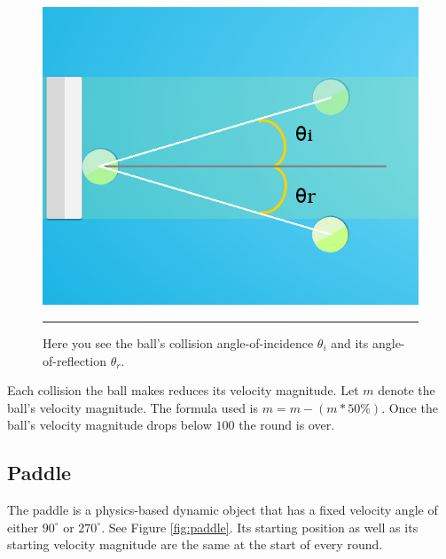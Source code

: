 \begin{figure}[htbp]  
  \centering
  \includegraphics[scale=0.5]{../Figures/Chapter3/angle.png}
  \rule{35em}{0.5pt}
  \caption[SimPL Angle of Incidence]{Here you see the ball's collision angle-of-incidence $\theta_i$ and its angle-of-reflection $\theta_r$.}
  \label{fig:angle}
\end{figure}

Each collision the ball makes reduces its velocity magnitude. Let $m$ denote the ball's velocity magnitude. The formula used is $m = m - (m * 50\%)$. Once the ball's velocity magnitude drops below $100$ the round is over.

\pagebreak

\subsection{Paddle}

The paddle is a physics-based dynamic object that has a fixed velocity angle of either $90^\circ$ or $270^\circ$. See Figure \ref{fig:paddle}. Its starting position as well as its starting velocity magnitude are the same at the start of every round. 

